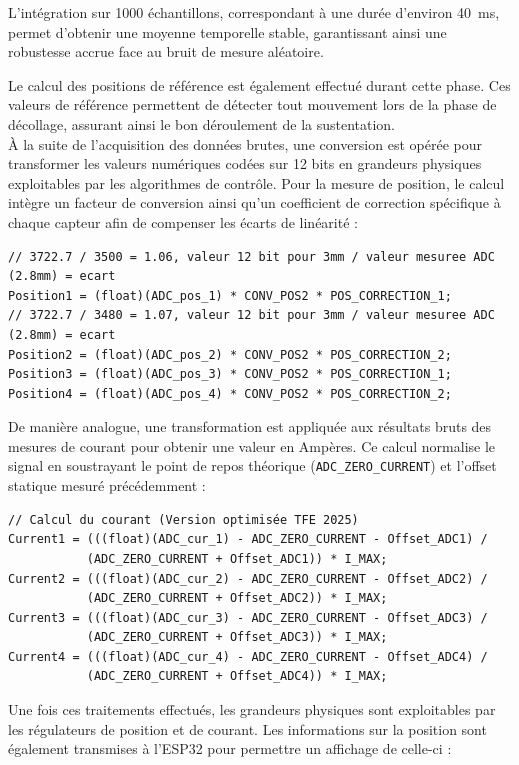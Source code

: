L'intégration sur 1000 échantillons, correspondant à une durée d'environ 40~ms, permet d'obtenir une moyenne temporelle stable, garantissant ainsi une robustesse accrue face au bruit de mesure aléatoire.

Le calcul des positions de référence est également effectué durant cette phase. Ces valeurs de référence permettent de détecter tout mouvement lors de la phase de décollage, assurant ainsi le bon déroulement de la sustentation.\\

À la suite de l'acquisition des données brutes, une conversion est opérée pour transformer les valeurs numériques codées sur 12 bits en grandeurs physiques exploitables par les algorithmes de contrôle. Pour la mesure de position, le calcul intègre un facteur de conversion ainsi qu'un coefficient de correction spécifique à chaque capteur afin de compenser les écarts de linéarité :

\begin{verbatim}
// 3722.7 / 3500 = 1.06, valeur 12 bit pour 3mm / valeur mesuree ADC (2.8mm) = ecart
Position1 = (float)(ADC_pos_1) * CONV_POS2 * POS_CORRECTION_1;
// 3722.7 / 3480 = 1.07, valeur 12 bit pour 3mm / valeur mesuree ADC (2.8mm) = ecart
Position2 = (float)(ADC_pos_2) * CONV_POS2 * POS_CORRECTION_2;
Position3 = (float)(ADC_pos_3) * CONV_POS2 * POS_CORRECTION_1;
Position4 = (float)(ADC_pos_4) * CONV_POS2 * POS_CORRECTION_2;
\end{verbatim}

De manière analogue, une transformation est appliquée aux résultats bruts des mesures de courant pour obtenir une valeur en Ampères. Ce calcul normalise le signal en soustrayant le point de repos théorique (\texttt{ADC\_ZERO\_CURRENT}) et l'offset statique mesuré précédemment :

\begin{verbatim}
// Calcul du courant (Version optimisée TFE 2025)
Current1 = (((float)(ADC_cur_1) - ADC_ZERO_CURRENT - Offset_ADC1) /
           (ADC_ZERO_CURRENT + Offset_ADC1)) * I_MAX;
Current2 = (((float)(ADC_cur_2) - ADC_ZERO_CURRENT - Offset_ADC2) /
           (ADC_ZERO_CURRENT + Offset_ADC2)) * I_MAX;
Current3 = (((float)(ADC_cur_3) - ADC_ZERO_CURRENT - Offset_ADC3) /
           (ADC_ZERO_CURRENT + Offset_ADC3)) * I_MAX;
Current4 = (((float)(ADC_cur_4) - ADC_ZERO_CURRENT - Offset_ADC4) /
           (ADC_ZERO_CURRENT + Offset_ADC4)) * I_MAX;
\end{verbatim}

Une fois ces traitements effectués, les grandeurs physiques sont exploitables par les régulateurs de position et de courant. Les informations sur la position sont également transmises à l'ESP32 pour permettre un affichage de celle-ci :


